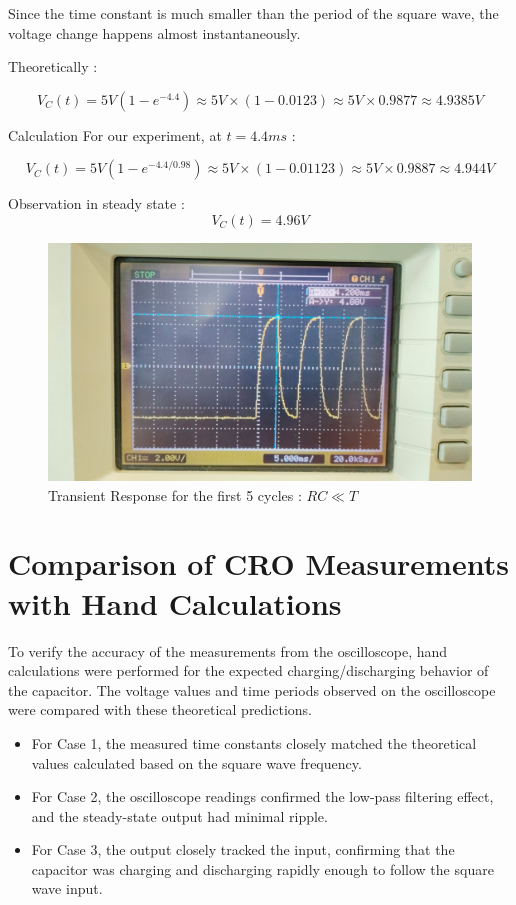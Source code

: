 \documentclass[a4paper,12pt]{article}
\begin{document}
Since the time constant is much smaller than the period of the square wave, the voltage change happens almost instantaneously.

Theoretically :

\[
V_C\left(t\right) = 5V \left( 1 - e^{-4.4} \right) \approx 5V \times (1 - 0.0123) \approx 5V \times 0.9877 \approx 4.9385V
\]

Calculation For our experiment, at \( t = 4.4ms \) :

\[
V_C\left(t\right) = 5V \left( 1 - e^{-4.4/0.98} \right) \approx 5V \times (1 - 0.01123) \approx 5V \times 0.9887 \approx 4.944V
\]

Observation in steady state :
\[
V_C\left(t\right) = 4.96V
\]

\begin{figure}[H]
    \centering
    \includegraphics[width=\textwidth]{figs/rc<t_tr.jpeg}
    \caption{Transient Response for the first 5 cycles : \( RC \ll T \)}
\end{figure}

\section*{Comparison of CRO Measurements with Hand Calculations}
To verify the accuracy of the measurements from the oscilloscope, hand calculations were performed for the expected charging/discharging behavior of the capacitor. The voltage values and time periods observed on the oscilloscope were compared with these theoretical predictions.

\begin{itemize}
    \item For Case 1, the measured time constants closely matched the theoretical values calculated based on the square wave frequency.
    \item For Case 2, the oscilloscope readings confirmed the low-pass filtering effect, and the steady-state output had minimal ripple.
    \item For Case 3, the output closely tracked the input, confirming that the capacitor was charging and discharging rapidly enough to follow the square wave input.
\end{itemize}
\end{document}
